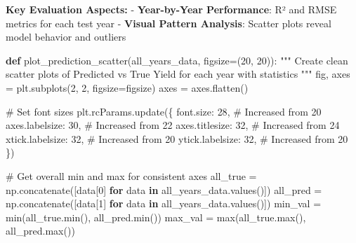 \documentclass[
  letterpaper,
  DIV=11,
  numbers=noendperiod]{scrreprt}
\newenvironment{Shaded}{\begin{snugshade}}{\end{snugshade}}
\newcommand{\BuiltInTok}[1]{\textcolor[rgb]{0.00,0.23,0.31}{#1}}
\newcommand{\CommentTok}[1]{\textcolor[rgb]{0.37,0.37,0.37}{#1}}
\newcommand{\ControlFlowTok}[1]{\textcolor[rgb]{0.00,0.23,0.31}{\textbf{#1}}}
\newcommand{\DecValTok}[1]{\textcolor[rgb]{0.68,0.00,0.00}{#1}}
\newcommand{\KeywordTok}[1]{\textcolor[rgb]{0.00,0.23,0.31}{\textbf{#1}}}
\newcommand{\NormalTok}[1]{\textcolor[rgb]{0.00,0.23,0.31}{#1}}
\newcommand{\OperatorTok}[1]{\textcolor[rgb]{0.37,0.37,0.37}{#1}}
\newcommand{\StringTok}[1]{\textcolor[rgb]{0.13,0.47,0.30}{#1}}
\begin{document}
\textbf{Key Evaluation Aspects:} - \textbf{Year-by-Year Performance}: R²
and RMSE metrics for each test year - \textbf{Visual Pattern Analysis}:
Scatter plots reveal model behavior and outliers

\begin{Shaded}
\begin{Highlighting}[]
\KeywordTok{def}\NormalTok{ plot\_prediction\_scatter(all\_years\_data, figsize}\OperatorTok{=}\NormalTok{(}\DecValTok{20}\NormalTok{, }\DecValTok{20}\NormalTok{)):}
    \CommentTok{"""}
\CommentTok{    Create clean scatter plots of Predicted vs True Yield for each year with statistics}
\CommentTok{    """}
\NormalTok{    fig, axes }\OperatorTok{=}\NormalTok{ plt.subplots(}\DecValTok{2}\NormalTok{, }\DecValTok{2}\NormalTok{, figsize}\OperatorTok{=}\NormalTok{figsize)}
\NormalTok{    axes }\OperatorTok{=}\NormalTok{ axes.flatten()}

    \CommentTok{\# Set font sizes}
\NormalTok{    plt.rcParams.update(\{}
    \StringTok{\textquotesingle{}font.size\textquotesingle{}}\NormalTok{: }\DecValTok{28}\NormalTok{,           }\CommentTok{\# Increased from 20}
    \StringTok{\textquotesingle{}axes.labelsize\textquotesingle{}}\NormalTok{: }\DecValTok{30}\NormalTok{,      }\CommentTok{\# Increased from 22}
    \StringTok{\textquotesingle{}axes.titlesize\textquotesingle{}}\NormalTok{: }\DecValTok{32}\NormalTok{,      }\CommentTok{\# Increased from 24}
    \StringTok{\textquotesingle{}xtick.labelsize\textquotesingle{}}\NormalTok{: }\DecValTok{32}\NormalTok{,     }\CommentTok{\# Increased from 20}
    \StringTok{\textquotesingle{}ytick.labelsize\textquotesingle{}}\NormalTok{: }\DecValTok{32}\NormalTok{,     }\CommentTok{\# Increased from 20}
\NormalTok{    \})}


    \CommentTok{\# Get overall min and max for consistent axes}
\NormalTok{    all\_true }\OperatorTok{=}\NormalTok{ np.concatenate([data[}\DecValTok{0}\NormalTok{] }\ControlFlowTok{for}\NormalTok{ data }\KeywordTok{in}\NormalTok{ all\_years\_data.values()])}
\NormalTok{    all\_pred }\OperatorTok{=}\NormalTok{ np.concatenate([data[}\DecValTok{1}\NormalTok{] }\ControlFlowTok{for}\NormalTok{ data }\KeywordTok{in}\NormalTok{ all\_years\_data.values()])}
\NormalTok{    min\_val }\OperatorTok{=} \BuiltInTok{min}\NormalTok{(all\_true.}\BuiltInTok{min}\NormalTok{(), all\_pred.}\BuiltInTok{min}\NormalTok{())}
\NormalTok{    max\_val }\OperatorTok{=} \BuiltInTok{max}\NormalTok{(all\_true.}\BuiltInTok{max}\NormalTok{(), all\_pred.}\BuiltInTok{max}\NormalTok{())}


\end{Highlighting}
\end{Shaded}
\end{document}
